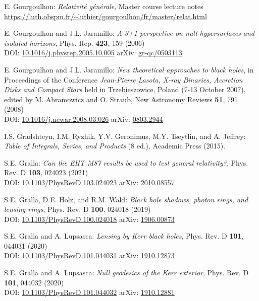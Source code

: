 \begin{thebibliography}{123}
E. Gourgoulhon:
{\em Relativité générale},
Master course lecture notes\\
\url{https://luth.obspm.fr/~luthier/gourgoulhon/fr/master/relat.html}

E. Gourgoulhon and J.L. Jaramillo:
{\em A 3+1 perspective on null hypersurfaces and isolated horizons},
Phys. Rep. {\bf 423}, 159 (2006)\\
DOI: \href{https://doi.org/10.1016/j.physrep.2005.10.005}{10.1016/j.physrep.2005.10.005}\hfill
arXiv: \href{https://arxiv.org/abs/gr-qc/0503113}{gr-qc/0503113}

E. Gourgoulhon and J.L. Jaramillo:
{\em New theoretical approaches to black holes},
in Proceedings of the Conference {\em Jean-Pierre Lasota, X-ray Binaries, Accretion Disks and Compact Stars} held in Trzebieszowice, Poland (7-13 October 2007), edited by M. Abramowicz and O. Straub, New Astronomy Reviews {\bf 51}, 791 (2008) \\
DOI: \href{https://doi.org/10.1016/j.newar.2008.03.026}{10.1016/j.newar.2008.03.026}\hfill
arXiv: \href{https://arxiv.org/abs/0803.2944}{0803.2944}

I.S. Gradshteyn, I.M. Ryzhik, Y.V. Geronimus, M.Y. Tseytlin, and A. Jeffrey:
{\em  Table of Integrals, Series, and Products} (8 ed.),
Academic Press (2015).

S.E. Gralla:
{\em Can the EHT M87 results be used to test general relativity?},
Phys. Rev. D {\bf 103}, 024023 (2021)\\
DOI: \href{https://doi.org/10.1103/PhysRevD.103.024023}{10.1103/PhysRevD.103.024023}\hfill
arXiv: \href{https://arxiv.org/abs/2010.08557}{2010.08557}

S.E. Gralla, D.E. Holz, and R.M. Wald:
{\em Black hole shadows, photon rings, and lensing rings},
Phys. Rev. D {\bf 100}, 024018 (2019)\\
DOI: \href{https://doi.org/10.1103/PhysRevD.100.024018}{10.1103/PhysRevD.100.024018}\hfill
arXiv: \href{https://arxiv.org/abs/1906.00873}{1906.00873}

S.E. Gralla and A. Lupsasca:
{\em Lensing by Kerr black holes},
Phys. Rev. D {\bf 101}, 044031 (2020)\\
DOI: \href{https://doi.org/10.1103/PhysRevD.101.044031}{10.1103/PhysRevD.101.044031}\hfill
arXiv: \href{https://arxiv.org/abs/1910.12873}{1910.12873}

S.E. Gralla and A. Lupsasca:
{\em Null geodesics of the Kerr exterior},
Phys. Rev. D {\bf 101}, 044032 (2020)\\
DOI: \href{https://doi.org/10.1103/PhysRevD.101.044032}{10.1103/PhysRevD.101.044032}\hfill
arXiv: \href{https://arxiv.org/abs/1910.12881}{1910.12881}


\end{thebibliography}
